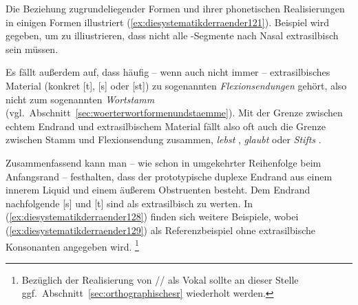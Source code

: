 Die Beziehung zugrundeliegender Formen und ihrer phonetischen Realisierungen in einigen Formen illustriert (\ref{ex:diesystematikderraender121}).
Beispiel \label{ex:diesystematikderraender127} wird gegeben, um zu illiustrieren, dass nicht alle \textipa{[t]}-Segmente nach Nasal extrasilbisch sein müssen.

\begin{exe}
  \ex \label{ex:diesystematikderraender121}
  \begin{xlist}
  \end{xlist}
\end{exe}

Es fällt außerdem auf, dass häufig -- wenn auch nicht immer -- extrasilbisches Material (konkret [t], [s] oder [st]) zu sogenannten \textit{Flexionsendungen} gehört, also nicht zum sogenannten \textit{Wortstamm} (vgl.\ Abschnitt~\ref{sec:woerterwortformenundstaemme}).
Mit der Grenze zwischen echtem Endrand und extrasilbischem Material fällt also oft auch die Grenze zwischen Stamm und Flexionsendung zusammen, \zB \textit{lebst} \textipa{[le:p+st]}, \textit{glaubt} \textipa{[gl\t{aO}p+t]} oder \textit{Stifts} \textipa{[StIft+s]}.

Zusammenfassend kann man -- wie schon in umgekehrter Reihenfolge beim Anfangsrand -- festhalten, dass der prototypische duplexe Endrand aus einem innerem Liquid und einem äußerem Obstruenten besteht.
Dem Endrand nachfolgende [s] und [t] sind als extrasilbisch zu werten.
In (\ref{ex:diesystematikderraender128}) finden sich weitere Beispiele, wobei (\ref{ex:diesystematikderraender129}) als Referenzbeispiel ohne extrasilbische Konsonanten angegeben wird.%
\footnote{Bezüglich der Realisierung von // als Vokal sollte an dieser Stelle ggf.\ Abschnitt~\ref{sec:orthographischesr} wiederholt werden.}

